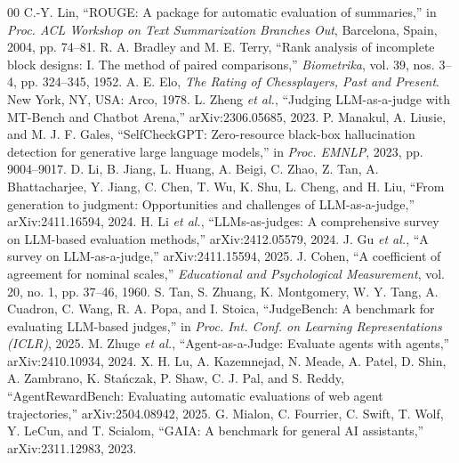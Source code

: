 \documentclass[conference]{IEEEtran}
\begin{document}
\begin{thebibliography}{00}
 C.-Y. Lin, ``ROUGE: A package for automatic evaluation of summaries,'' in \emph{Proc. ACL Workshop on Text Summarization Branches Out}, Barcelona, Spain, 2004, pp. 74--81.
 R. A. Bradley and M. E. Terry, ``Rank analysis of incomplete block designs: I. The method of paired comparisons,'' \emph{Biometrika}, vol. 39, nos. 3--4, pp. 324--345, 1952.
 A. E. Elo, \emph{The Rating of Chessplayers, Past and Present}. New York, NY, USA: Arco, 1978.
 L. Zheng \emph{et al.}, ``Judging LLM-as-a-judge with MT-Bench and Chatbot Arena,'' arXiv:2306.05685, 2023.
 P. Manakul, A. Liusie, and M. J. F. Gales, ``SelfCheckGPT: Zero-resource black-box hallucination detection for generative large language models,'' in \emph{Proc. EMNLP}, 2023, pp. 9004--9017.
 D. Li, B. Jiang, L. Huang, A. Beigi, C. Zhao, Z. Tan, A. Bhattacharjee, Y. Jiang, C. Chen, T. Wu, K. Shu, L. Cheng, and H. Liu, ``From generation to judgment: Opportunities and challenges of LLM-as-a-judge,'' arXiv:2411.16594, 2024.
 H. Li \emph{et al.}, ``LLMs-as-judges: A comprehensive survey on LLM-based evaluation methods,'' arXiv:2412.05579, 2024.
 J. Gu \emph{et al.}, ``A survey on LLM-as-a-judge,'' arXiv:2411.15594, 2025.
 J. Cohen, ``A coefficient of agreement for nominal scales,'' \emph{Educational and Psychological Measurement}, vol. 20, no. 1, pp. 37--46, 1960.
 S. Tan, S. Zhuang, K. Montgomery, W. Y. Tang, A. Cuadron, C. Wang, R. A. Popa, and I. Stoica, ``JudgeBench: A benchmark for evaluating LLM-based judges,'' in \emph{Proc. Int. Conf. on Learning Representations (ICLR)}, 2025.
 M. Zhuge \emph{et al.}, ``Agent-as-a-Judge: Evaluate agents with agents,'' arXiv:2410.10934, 2024.
 X. H. Lu, A. Kazemnejad, N. Meade, A. Patel, D. Shin, A. Zambrano, K. Sta\'nczak, P. Shaw, C. J. Pal, and S. Reddy, ``AgentRewardBench: Evaluating automatic evaluations of web agent trajectories,'' arXiv:2504.08942, 2025.
 G. Mialon, C. Fourrier, C. Swift, T. Wolf, Y. LeCun, and T. Scialom, ``GAIA: A benchmark for general AI assistants,'' arXiv:2311.12983, 2023.
\end{thebibliography}
\end{document}
